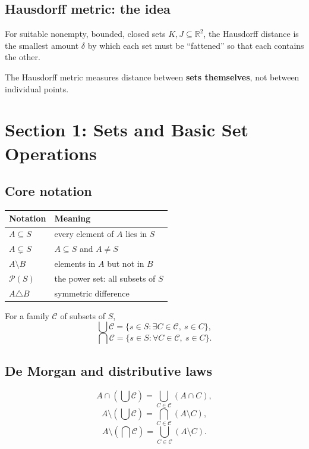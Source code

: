 \documentclass[11pt,a4paper]{article}
\newcommand{\R}{\mathbb{R}}
\newcommand{\PP}{\mathcal{P}}
\begin{document}
\subsection{Hausdorff metric: the idea}
For suitable nonempty, bounded, closed sets $K,J\subseteq \R^2$, the Hausdorff distance is the smallest amount $\delta$ by which each set must be ``fattened'' so that each contains the other.

\begin{keybox}
The Hausdorff metric measures distance between \textbf{sets themselves}, not between individual points.
\end{keybox}

\newpage
\section{Section 1: Sets and Basic Set Operations}

\subsection{Core notation}
\begin{center}
\begin{tabularx}{0.95\textwidth}{>{\bfseries}l X}
\toprule
Notation & Meaning\\
\midrule
$A\subseteq S$ & every element of $A$ lies in $S$\\
$A\subsetneq S$ & $A\subseteq S$ and $A\ne S$\\
$A\setminus B$ & elements in $A$ but not in $B$\\
$\PP(S)$ & the power set: all subsets of $S$\\
$A\triangle B$ & symmetric difference\\
\bottomrule
\end{tabularx}
\end{center}

For a family $\mathcal C$ of subsets of $S$,
\[
\bigcup \mathcal C=\{s\in S: \exists C\in\mathcal C,\ s\in C\},
\]
\[
\bigcap \mathcal C=\{s\in S: \forall C\in\mathcal C,\ s\in C\}.
\]

\subsection{De Morgan and distributive laws}
\[
A\cap\left(\bigcup \mathcal C\right)=\bigcup_{C\in\mathcal C}(A\cap C),
\]
\[
A\setminus\left(\bigcup \mathcal C\right)=\bigcap_{C\in\mathcal C}(A\setminus C),
\]
\[
A\setminus\left(\bigcap \mathcal C\right)=\bigcup_{C\in\mathcal C}(A\setminus C).
\]
\end{document}
